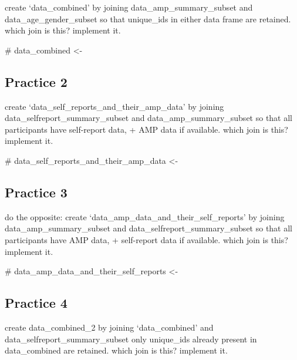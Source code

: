 \documentclass[
  letterpaper,
  DIV=11,
  numbers=noendperiod]{scrreprt}
\newenvironment{Shaded}{\begin{snugshade}}{\end{snugshade}}
\newcommand{\CommentTok}[1]{\textcolor[rgb]{0.37,0.37,0.37}{#1}}
\begin{document}
create `data\_combined' by joining data\_amp\_summary\_subset and
data\_age\_gender\_subset so that unique\_ids in either data frame are
retained. which join is this? implement it.

\begin{Shaded}
\begin{Highlighting}[]
\CommentTok{\# data\_combined \textless{}{-} }
\end{Highlighting}
\end{Shaded}

\subsection{Practice 2}\label{practice-2}

create `data\_self\_reports\_and\_their\_amp\_data' by joining
data\_selfreport\_summary\_subset and data\_amp\_summary\_subset so that
all participants have self-report data, + AMP data if available. which
join is this? implement it.

\begin{Shaded}
\begin{Highlighting}[]
\CommentTok{\# data\_self\_reports\_and\_their\_amp\_data \textless{}{-} }
\end{Highlighting}
\end{Shaded}

\subsection{Practice 3}\label{practice-3}

do the opposite: create `data\_amp\_data\_and\_their\_self\_reports' by
joining data\_amp\_summary\_subset and data\_selfreport\_summary\_subset
so that all participants have AMP data, + self-report data if available.
which join is this? implement it.

\begin{Shaded}
\begin{Highlighting}[]
\CommentTok{\# data\_amp\_data\_and\_their\_self\_reports \textless{}{-} }
\end{Highlighting}
\end{Shaded}

\subsection{Practice 4}\label{practice-4}

create data\_combined\_2 by joining `data\_combined' and
data\_selfreport\_summary\_subset only unique\_ids already present in
data\_combined are retained. which join is this? implement it.
\end{document}

